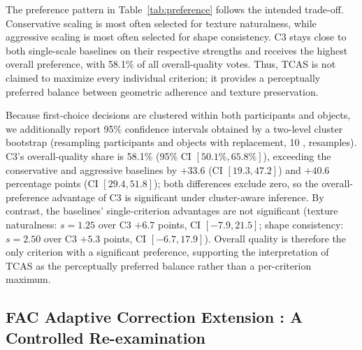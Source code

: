 \documentclass[times,twocolumn,final]{elsarticle}
\providecommand{\DIFadd}[1]{{\protect\color{blue} \sf #1}} %
\providecommand{\DIFaddbegin}{} %
\providecommand{\DIFaddend}{} %
\newcommand{\DIFaddincludegraphics}[2][]{{\color{blue}\fbox{\DIFOincludegraphics[#1]{#2}}}} %
\DeclareRobustCommand{\DIFaddbegin}{\DIFOaddbegin \let\includegraphics\DIFaddincludegraphics} %
\DeclareRobustCommand{\DIFaddend}{\DIFOaddend \let\includegraphics\DIFOincludegraphics} %
\begin{document}
\DIFaddbegin \DIFadd{The preference pattern in Table~\ref{tab:preference} follows the intended trade-off. Conservative scaling is most often selected for texture naturalness, while aggressive scaling is most often selected for shape consistency. C3 stays close to both single-scale baselines on their respective strengths and receives the highest overall preference, with 58.1\% of all overall-quality votes. Thus, TCAS is not claimed to maximize every individual criterion; it provides a perceptually preferred balance between geometric adherence and texture preservation.
}

\DIFadd{Because first-choice decisions are clustered within both participants and objects, we additionally report 95\% confidence intervals obtained by a two-level cluster bootstrap (resampling participants and objects with replacement, 10}{\DIFadd{,}}\DIFadd{000 resamples). C3's overall-quality share is 58.1\% (95\% CI $[50.1\%, 65.8\%]$), exceeding the conservative and aggressive baselines by $+33.6$ (CI $[19.3, 47.2]$) and $+40.6$ percentage points (CI $[29.4, 51.8]$); both differences exclude zero, so the overall-preference advantage of C3 is significant under cluster-aware inference. By contrast, the baselines' single-criterion advantages are not significant (texture naturalness: $s = 1.25$ over C3 $+6.7$ points, CI $[-7.9, 21.5]$; shape consistency: $s = 2.50$ over C3 $+5.3$ points, CI $[-6.7, 17.9]$). Overall quality is therefore the only criterion with a significant preference, supporting the interpretation of TCAS as the perceptually preferred balance rather than a per-criterion maximum.
}

\DIFaddend \subsection{FAC Adaptive Correction Extension\DIFaddbegin \DIFadd{: A Controlled Re-examination}\DIFaddend }
\label{subsec:facexp}
\end{document}

